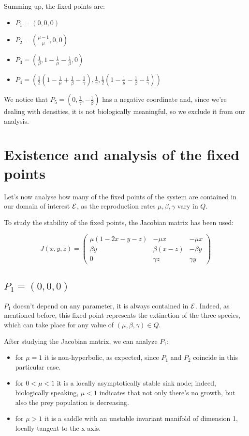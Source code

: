 \documentclass[10pt]{Configuration_Files/PoliMi3i_thesis}
\newcommand*{\mycirc}[1]{\tikz {\node at (0,0) [inner sep=0] {};\fill (0,0.5ex) circle (#1);}}
\begin{document}
Summing up, the fixed points are:
\begin{itemize}
\item[\mycirc{2pt}] $P_1 = (0,0,0)$
\item[\mycirc{2pt}] $P_2 = (\frac{\mu-1}{\mu}, 0, 0)$
\item[\mycirc{2pt}] $P_3 = (\frac{1}{\beta}, 1-\frac{1}{\mu}-\frac{1}{\beta}, 0)$
\item[\mycirc{2pt}] $P_4 = (\frac{1}{2}(1-\frac{1}{\mu}+\frac{1}{\beta}-\frac{1}{\gamma}), \frac{1}{\gamma}, \frac{1}{2}(1-\frac{1}{\mu}-\frac{1}{\beta}-\frac{1}{\gamma}))$
\end{itemize}  
We notice that  $P_5 = (0, \frac{1}{\gamma}, -\frac{1}{\beta})$ has a negative coordinate and, since we're dealing with densities, it is not biologically meaningful, so we exclude it from our analysis.

\section{Existence and analysis of the fixed points}

Let's now analyse how many of the fixed points of the system are contained in our domain of interest $\mathcal{E}$, as the reproduction rates $\mu, \beta, \gamma$ vary in $Q$.

To study the stability of the fixed points, the Jacobian matrix has been used: 

$$J(x,y,z) = \begin{pmatrix} \mu(1-2x-y-z) & -\mu x & -\mu x \\ \beta y & \beta(x-z) & -\beta y \\ 0 & \gamma z & \gamma y
\end{pmatrix} $$

\subsection{$P_1 = (0,0,0)$}
$P_1$ doesn't depend on any parameter, it is always contained in $\mathcal{E}$. Indeed, as mentioned before, this fixed point represents the extinction of the three species, which can take place for any value of $(\mu,\beta,\gamma)\in Q$.

After studying the Jacobian matrix, we can analyze $P_1$:
\begin{itemize}
\item for $\mu = 1$ it is non-hyperbolic, as expected, since $P_1$ and $P_2$ coincide in this particular case.
\item for $0 < \mu < 1$ it is a locally asymptotically stable sink node; indeed, biologically speaking, $\mu<1$ indicates that not only there's no growth, but also the prey population is decreasing.  
\item for $\mu > 1$ it is a saddle with an unstable invariant manifold of dimension 1, locally tangent to the x-axis.
\end{itemize}
\end{document}
